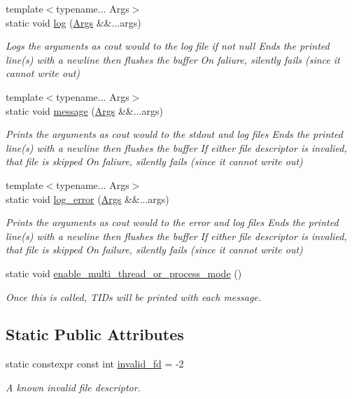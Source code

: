 \begin{DoxyCompactItemize}
{\footnotesize template$<$typename... Args$>$ }\\static void \hyperlink{class_utilities_a996db67175e47946e80539602c2ca6ee}{log} (\hyperlink{struct_args}{Args} \&\&...args)
\begin{DoxyCompactList}\small\item\em Logs the arguments as cout would to the log file if not null Ends the printed line(s) with a newline then flushes the buffer On faliure, silently fails (since it cannot write out) \end{DoxyCompactList}\item 
{\footnotesize template$<$typename... Args$>$ }\\static void \hyperlink{class_utilities_ae8efd2e8950fe6641d87296b8120d246}{message} (\hyperlink{struct_args}{Args} \&\&...args)
\begin{DoxyCompactList}\small\item\em Prints the arguments as cout would to the stdout and log files Ends the printed line(s) with a newline then flushes the buffer If either file descriptor is invalied, that file is skipped On faliure, silently fails (since it cannot write out) \end{DoxyCompactList}\item 
{\footnotesize template$<$typename... Args$>$ }\\static void \hyperlink{class_utilities_a3db9e78ec85d66d104cbf451706e1dbe}{log\-\_\-error} (\hyperlink{struct_args}{Args} \&\&...args)
\begin{DoxyCompactList}\small\item\em Prints the arguments as cout would to the error and log files Ends the printed line(s) with a newline then flushes the buffer If either file descriptor is invalied, that file is skipped On failure, silently fails (since it cannot write out) \end{DoxyCompactList}\item 
static void \hyperlink{class_utilities_a384728ae9b72982c1351d881ba7ff007}{enable\-\_\-multi\-\_\-thread\-\_\-or\-\_\-process\-\_\-mode} ()
\begin{DoxyCompactList}\small\item\em Once this is called, T\-I\-Ds will be printed with each message. \end{DoxyCompactList}\end{DoxyCompactItemize}
\subsection*{Static Public Attributes}
\begin{DoxyCompactItemize}
\item 
static constexpr const int \hyperlink{class_utilities_a9633de25a993962a82210f566f2e98d5}{invalid\-\_\-fd} = -\/2
\begin{DoxyCompactList}\small\item\em A known invalid file descriptor. \end{DoxyCompactList}\end{DoxyCompactItemize}
